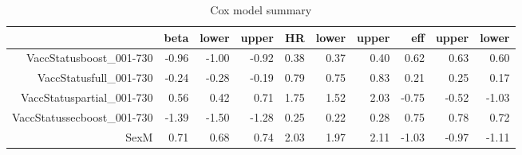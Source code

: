 \begin{table}[ht]
\centering
\begin{tabular}{rrrrrrrrrr}
  \hline
 & beta & lower & upper & HR & lower & upper & eff & upper & lower \\ 
  \hline
VaccStatusboost\_001-730 & -0.96 & -1.00 & -0.92 & 0.38 & 0.37 & 0.40 & 0.62 & 0.63 & 0.60 \\ 
  VaccStatusfull\_001-730 & -0.24 & -0.28 & -0.19 & 0.79 & 0.75 & 0.83 & 0.21 & 0.25 & 0.17 \\ 
  VaccStatuspartial\_001-730 & 0.56 & 0.42 & 0.71 & 1.75 & 1.52 & 2.03 & -0.75 & -0.52 & -1.03 \\ 
  VaccStatussecboost\_001-730 & -1.39 & -1.50 & -1.28 & 0.25 & 0.22 & 0.28 & 0.75 & 0.78 & 0.72 \\ 
  SexM & 0.71 & 0.68 & 0.74 & 2.03 & 1.97 & 2.11 & -1.03 & -0.97 & -1.11 \\ 
   \hline
\end{tabular}
\caption{Cox model summary} 
\end{table}
